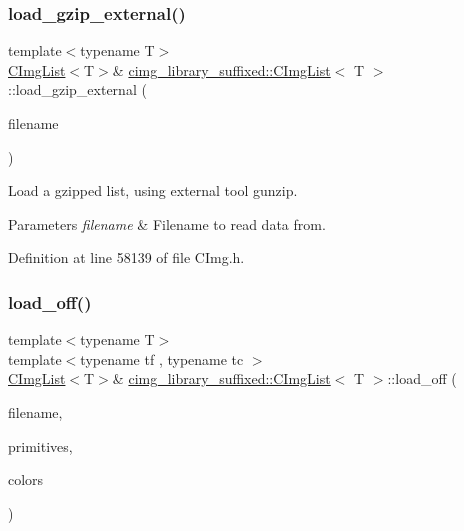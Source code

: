 \subsubsection{\texorpdfstring{load\+\_\+gzip\+\_\+external()}{load\_gzip\_external()}}
{\footnotesize\ttfamily template$<$typename T$>$ \\
\hyperlink{structcimg__library__suffixed_1_1CImgList}{C\+Img\+List}$<$T$>$\& \hyperlink{structcimg__library__suffixed_1_1CImgList}{cimg\+\_\+library\+\_\+suffixed\+::\+C\+Img\+List}$<$ T $>$\+::load\+\_\+gzip\+\_\+external (\begin{DoxyParamCaption}\item[{const \hyperlink{classchar}{char} $\ast$const}]{filename }\end{DoxyParamCaption})\hspace{0.3cm}{\ttfamily [inline]}}



Load a gzipped list, using external tool \textquotesingle{}gunzip\textquotesingle{}. 


\begin{DoxyParams}{Parameters}
{\em filename} & Filename to read data from. \\
\hline
\end{DoxyParams}


Definition at line 58139 of file C\+Img.\+h.

\mbox{\label{structcimg__library__suffixed_1_1CImgList_a01772b523fe250d7d1f11e2e7eda0456}} 
\subsubsection{\texorpdfstring{load\+\_\+off()}{load\_off()}}
{\footnotesize\ttfamily template$<$typename T$>$ \\
template$<$typename tf , typename tc $>$ \\
\hyperlink{structcimg__library__suffixed_1_1CImgList}{C\+Img\+List}$<$T$>$\& \hyperlink{structcimg__library__suffixed_1_1CImgList}{cimg\+\_\+library\+\_\+suffixed\+::\+C\+Img\+List}$<$ T $>$\+::load\+\_\+off (\begin{DoxyParamCaption}\item[{const \hyperlink{classchar}{char} $\ast$const}]{filename,  }\item[{\hyperlink{structcimg__library__suffixed_1_1CImgList}{C\+Img\+List}$<$ tf $>$ \&}]{primitives,  }\item[{\hyperlink{structcimg__library__suffixed_1_1CImgList}{C\+Img\+List}$<$ tc $>$ \&}]{colors }\end{DoxyParamCaption})\hspace{0.3cm}{\ttfamily [inline]}}



